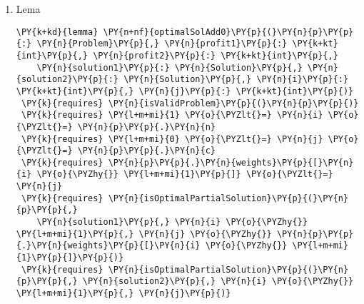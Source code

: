 \begin{sloppypar}
\begin{enumerate}
\begin{Verbatim}[commandchars=\\\{\}]
      \PY{p}{\PYZob{}}
        \PY{n}{gainAdd1}\PY{p}{(}\PY{n}{p}\PY{p}{,} \PY{n}{solution1} \PY{o}{+} \PY{p}{[}\PY{l+m+mi}{1}\PY{p}{]}\PY{p}{)}\PY{p}{;}
        \PY{k}{assert} \PY{n}{gain}\PY{p}{(}\PY{n}{p}\PY{p}{,} \PY{n}{solution1} \PY{o}{+} \PY{p}{[}\PY{l+m+mi}{1}\PY{p}{]}\PY{p}{)} \PY{o}{==} 
            \PY{n}{gain}\PY{p}{(}\PY{n}{p}\PY{p}{,} \PY{n}{solution1}\PY{p}{)} \PY{o}{+} \PY{n}{p}\PY{p}{.}\PY{n}{gains}\PY{p}{[}\PY{n}{i} \PY{o}{\PYZhy{}} \PY{l+m+mi}{1}\PY{p}{]}\PY{p}{;}
      \PY{p}{\PYZcb{}}
      \PY{k}{assert} \PY{k+kc}{false}\PY{p}{;} 
    \PY{p}{\PYZcb{}} \PY{k}{else} \PY{p}{\PYZob{}}
      \PY{n}{gainAdd1Optimal}\PY{p}{(}\PY{n}{p}\PY{p}{,} \PY{n}{profit1}\PY{p}{,} \PY{n}{profit2}\PY{p}{,} 
        \PY{n}{solution1}\PY{p}{,} \PY{n}{solution2}\PY{p}{,} \PY{n}{x}\PY{p}{,} \PY{n}{i}\PY{p}{,} \PY{n}{j}\PY{p}{)}\PY{p}{;}
      \PY{k}{assert} \PY{n}{gain}\PY{p}{(}\PY{n}{p}\PY{p}{,} \PY{n}{x}\PY{p}{)} \PY{o}{==} \PY{n}{gain}\PY{p}{(}\PY{n}{p}\PY{p}{,} \PY{n}{solution1} \PY{o}{+} \PY{p}{[}\PY{l+m+mi}{1}\PY{p}{]}\PY{p}{)}\PY{p}{;}
    \PY{p}{\PYZcb{}}
  \PY{p}{\PYZcb{}}
\PY{p}{\PYZcb{}}
\end{Verbatim}
     \item Lema 
     \begin{Verbatim}[commandchars=\\\{\}]
\PY{k+kd}{lemma} \PY{n+nf}{optimalSolAdd0}\PY{p}{(}\PY{n}{p}\PY{p}{:} \PY{n}{Problem}\PY{p}{,} \PY{n}{profit1}\PY{p}{:} \PY{k+kt}{int}\PY{p}{,} \PY{n}{profit2}\PY{p}{:} \PY{k+kt}{int}\PY{p}{,} 
    \PY{n}{solution1}\PY{p}{:} \PY{n}{Solution}\PY{p}{,} \PY{n}{solution2}\PY{p}{:} \PY{n}{Solution}\PY{p}{,} \PY{n}{i}\PY{p}{:} \PY{k+kt}{int}\PY{p}{,} \PY{n}{j}\PY{p}{:} \PY{k+kt}{int}\PY{p}{)}
 \PY{k}{requires} \PY{n}{isValidProblem}\PY{p}{(}\PY{n}{p}\PY{p}{)}
 \PY{k}{requires} \PY{l+m+mi}{1} \PY{o}{\PYZlt{}=} \PY{n}{i} \PY{o}{\PYZlt{}=} \PY{n}{p}\PY{p}{.}\PY{n}{n}
 \PY{k}{requires} \PY{l+m+mi}{0} \PY{o}{\PYZlt{}=} \PY{n}{j} \PY{o}{\PYZlt{}=} \PY{n}{p}\PY{p}{.}\PY{n}{c}
 \PY{k}{requires} \PY{n}{p}\PY{p}{.}\PY{n}{weights}\PY{p}{[}\PY{n}{i} \PY{o}{\PYZhy{}} \PY{l+m+mi}{1}\PY{p}{]} \PY{o}{\PYZlt{}=} \PY{n}{j}
 \PY{k}{requires} \PY{n}{isOptimalPartialSolution}\PY{p}{(}\PY{n}{p}\PY{p}{,} 
    \PY{n}{solution1}\PY{p}{,} \PY{n}{i} \PY{o}{\PYZhy{}} \PY{l+m+mi}{1}\PY{p}{,} \PY{n}{j} \PY{o}{\PYZhy{}} \PY{n}{p}\PY{p}{.}\PY{n}{weights}\PY{p}{[}\PY{n}{i} \PY{o}{\PYZhy{}} \PY{l+m+mi}{1}\PY{p}{]}\PY{p}{)}
 \PY{k}{requires} \PY{n}{isOptimalPartialSolution}\PY{p}{(}\PY{n}{p}\PY{p}{,} \PY{n}{solution2}\PY{p}{,} \PY{n}{i} \PY{o}{\PYZhy{}} \PY{l+m+mi}{1}\PY{p}{,} \PY{n}{j}\PY{p}{)}

\end{Verbatim}
\end{enumerate}
\end{sloppypar}
